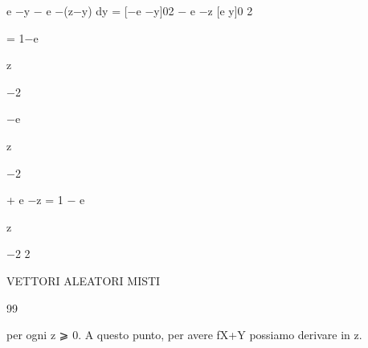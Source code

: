 \documentclass[a4paper,portrait,12pt]{article}
\begin{document}
\begin{flushleft}
e $-$y $-$ e $-$(z$-$y) dy = [$-$e $-$y]02 $-$ e $-$z [e y]0 2
\end{flushleft}





\begin{flushleft}
= 1$-$e
\end{flushleft}





\begin{flushleft}
z
\end{flushleft}





$-$2





\begin{flushleft}
$-$e
\end{flushleft}





\begin{flushleft}
z
\end{flushleft}





$-$2





\begin{flushleft}
+ e $-$z = 1 $-$ e
\end{flushleft}





\begin{flushleft}
z
\end{flushleft}





$-$2 2





\begin{flushleft}
 VETTORI ALEATORI MISTI
\end{flushleft}





99





\begin{flushleft}
per ogni z ⩾ 0. A questo punto, per avere fX+Y possiamo derivare in z.
\end{flushleft}
\end{document}

